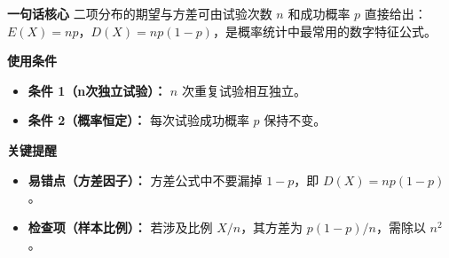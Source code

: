 \begin{summarybox}
	\textbf{\textcolor{CSummary}{一句话核心}}
	二项分布的期望与方差可由试验次数 $n$ 和成功概率 $p$ 直接给出：$E(X)=np$，$D(X)=np(1-p)$，是概率统计中最常用的数字特征公式。

	\medskip
	\textbf{\textcolor{CSummary}{使用条件}}
	\begin{itemize}[leftmargin=*, itemsep=0.5em, topsep=0.4em]
		\item \textbf{条件 1（n次独立试验）：} $n$ 次重复试验相互独立。
		\item \textbf{条件 2（概率恒定）：} 每次试验成功概率 $p$ 保持不变。
	\end{itemize}

	\medskip
	\textbf{\textcolor{CSummary}{关键提醒}}
	\begin{itemize}[leftmargin=*, itemsep=0.5em, topsep=0.4em]
		\item \textbf{易错点（方差因子）：} 方差公式中不要漏掉 $1-p$，即 $D(X)=np(1-p)$。
		\item \textbf{检查项（样本比例）：} 若涉及比例 $X/n$，其方差为 $p(1-p)/n$，需除以 $n^2$。
	\end{itemize}

\end{summarybox}
